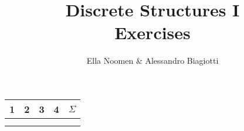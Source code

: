 \documentclass{article}
\title{Discrete Structures I \\ Exercises}
\author{Ella Noomen \& Alessandro Biagiotti}
\date{}
\begin{document}
\maketitle
\begin{center}
    \begin{tabular}{|c|c|c|c|c|}
        \hline
        1 & 2 & 3 & 4 & $\Sigma$ \\
        \hline
        & & & & \\
        & & & & \\
        \hline
    \end{tabular}
\end{center}








\end{document}

